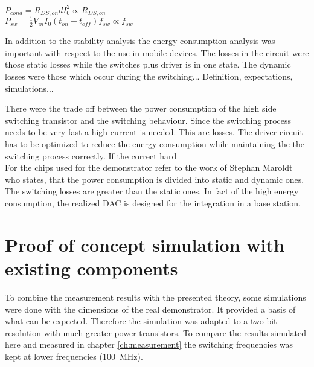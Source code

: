 $ P_{cond} = R_{DS,on}dI_0^2 \propto R_{DS,on} $ \\
$ P_{sw} = \frac{1}{2} V_{in}I_0(t_{on}+t_{off})f_{sw} \propto f_{sw} $ 

In addition to the stability analysis the energy consumption analysis was important with respect to the use in mobile devices.
The losses in the circuit were those static losses while the switches plus driver is in one state.
The dynamic losses were those which occur during the switching...
Definition, expectations, simulations...

There were the trade off between the power consumption of the high side switching transistor and the switching behaviour.
Since the switching process needs to be very fast a high current is needed.
This are losses.
The driver circuit has to be optimized to reduce the energy consumption while maintaining the the switching process correctly.
If the correct hard 
\\
 For the chips used for the demonstrator refer to the work of Stephan Maroldt who states, that the power consumption is divided into static and dynamic ones. The switching losses are greater than the static ones.
In fact of the high energy consumption, the realized DAC is designed for the integration in a base station.

\section{Proof of concept simulation with existing components}
\label{ch:ProofOfConceptWithExistingComponents}
To combine the measurement results with the presented theory, some simulations were done with the dimensions of the real demonstrator.
It provided a basis of what can be expected.
Therefore the simulation was adapted to a two bit resolution with much greater power transistors.
To compare the results simulated here and measured in chapter \ref{ch:measurement} the switching frequencies was kept at lower frequencies (\SI{100}{\mega \hertz}).

